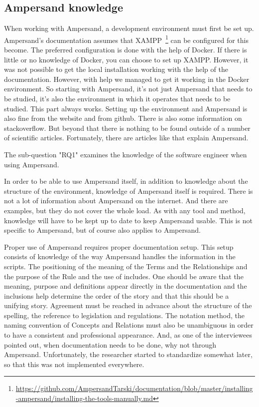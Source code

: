 \subsection{Ampersand knowledge}\label{subsection:ampersand-knowledge}
When working with Ampersand, a development environment must first be set up.
Ampersand's documentation assumes that XAMPP~\footnote{\url{https://github.com/AmpersandTarski/documentation/blob/master/installing-ampersand/installing-the-tools-manually.md}} can be configured for this become.
The preferred configuration is done with the help of Docker.
If there is little or no knowledge of Docker, you can choose to set up XAMPP.
However, it was not possible to get the local installation working with the help of the documentation.
However, with help we managed to get it working in the Docker environment.
So starting with Ampersand, it's not just Ampersand that needs to be studied, it's also the environment in which it operates that needs to be studied.
This part always works.
Setting up the environment and Ampersand is also fine from the website and from github.
There is also some information on stackoverflow.
But beyond that there is nothing to be found outside of a number of scientific articles.
Fortunately, there are articles like \cite{de_swart_ampersand_2011} that explain Ampersand.

The sub-question "\acrlong{RQ1}" examines the knowledge of the software engineer when using Ampersand.

In order to be able to use Ampersand itself, in addition to knowledge about the structure of the environment, knowledge of Ampersand itself is required.
There is not a lot of information about Ampersand on the internet.
And there are examples, but they do not cover the whole load.
As with any tool and method, knowledge will have to be kept up to date to keep Ampersand usable.
This is not specific to Ampersand, but of course also applies to Ampersand.

Proper use of Ampersand requires proper documentation setup.
This setup consists of knowledge of the way Ampersand handles the information in the scripts.
The positioning of the meaning of the Terms and the Relationships and the purpose of the Rule and the use of includes.
One should be aware that the meaning, purpose and definitions appear directly in the documentation and the inclusions help determine the order of the story and that this should be a unifying story.
Agreement must be reached in advance about the structure of the spelling, the reference to legislation and regulations.
The notation method, the naming convention of Concepts and Relations must also be unambiguous in order to have a consistent and professional appearance.
And, as one of the interviewees pointed out, when documentation needs to be done, why not through Ampersand.
Unfortunately, the researcher started to standardize somewhat later, so that this was not implemented everywhere.

